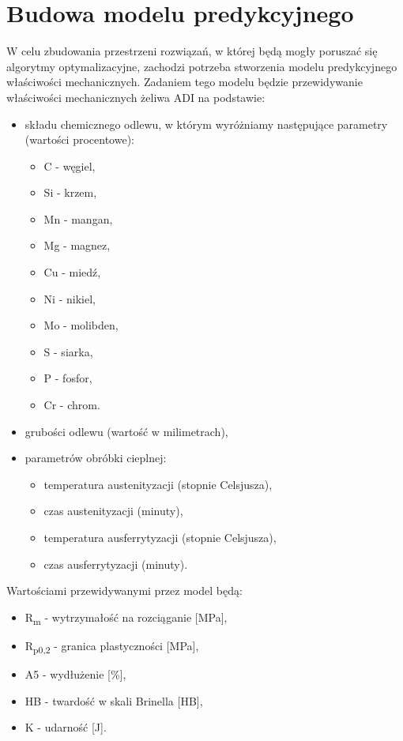 \section{Budowa modelu predykcyjnego}
\label{sec:model}
W celu zbudowania przestrzeni rozwiązań, w której będą mogły poruszać się algorytmy optymalizacyjne, zachodzi potrzeba stworzenia modelu predykcyjnego właściwości mechanicznych. Zadaniem tego modelu będzie przewidywanie właściwości mechanicznych żeliwa ADI na podstawie:
\begin{itemize}
    \item składu chemicznego odlewu, w którym wyróżniamy następujące parametry (wartości procentowe):
    \begin{itemize}
        \item C - węgiel,
        \item Si - krzem,
        \item Mn - mangan,
        \item Mg - magnez,
        \item Cu - miedź,
        \item Ni - nikiel,
        \item Mo - molibden,
        \item S - siarka,
        \item P - fosfor,
        \item Cr - chrom.
    \end{itemize}
    \item grubości odlewu (wartość w milimetrach),
    \item parametrów obróbki cieplnej:
    \begin{itemize}
        \item temperatura austenityzacji (stopnie Celsjusza),
        \item czas austenityzacji (minuty),
        \item temperatura ausferrytyzacji (stopnie Celsjusza),
        \item czas ausferrytyzacji (minuty).
    \end{itemize}
\end{itemize}
Wartościami przewidywanymi przez model będą:
\begin{itemize}
    \item R\textsubscript{m} - wytrzymałość na rozciąganie [MPa],
    \item R\textsubscript{p0,2} - granica plastyczności [MPa],
    \item A5 - wydłużenie [\%],
    \item HB - twardość w skali Brinella [HB],
    \item K - udarność [J].
\end{itemize}

